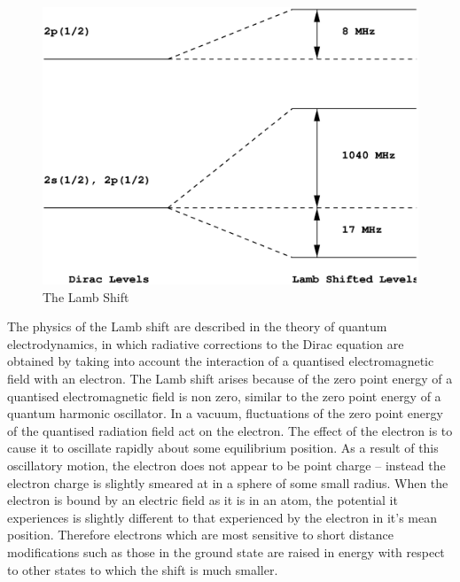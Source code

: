 \documentclass[a4paper]{IEEEtran}
\begin{document}
    \begin{figure}[!ht] 
        \centering
        \includegraphics[width=\columnwidth]{lamb.eps}
        \caption{The Lamb Shift} 
        \label{fig:lamb} 
    \end{figure} 

    The physics of the Lamb shift are described in the theory of quantum electrodynamics,
    in which radiative corrections to the Dirac equation are obtained by taking into
    account the interaction of a quantised electromagnetic field with an electron.
    The Lamb shift arises because of the zero point energy of a quantised electromagnetic
    field is non zero, similar to the zero point energy of a quantum harmonic oscillator.
    In a vacuum, fluctuations of the zero point energy of the quantised radiation field
    act on the electron. The effect of the electron is to cause it to oscillate rapidly
    about some equilibrium position. As a result of this oscillatory motion, the electron
    does not appear to be point charge -- instead the electron charge is slightly smeared
    at in a sphere of some small radius. When the electron is bound by an electric field
    as it is in an atom, the potential it experiences is slightly different to that 
    experienced by the electron in it's mean position. Therefore electrons which are
    most sensitive to short distance modifications such as those in the ground state
    are raised in energy with respect to other states to which the shift is much smaller.
\end{document}
